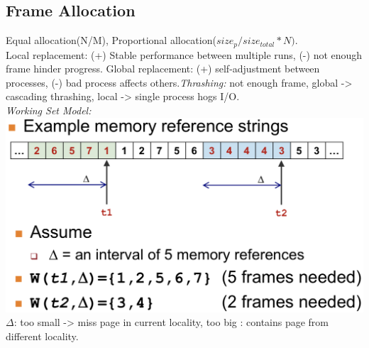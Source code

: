\subsection*{Frame Allocation}
Equal allocation(N/M), Proportional allocation($size_p/size_{total}*N)$.\\
Local replacement: (+) Stable performance between multiple runs, (-) not enough frame hinder progress. Global replacement: (+) self-adjustment between processes, (-) bad process affects others.\emph{Thrashing:} not enough frame, global -> cascading thrashing, local -> single process hogs I/O.\\
\emph{Working Set Model:}\\
\includegraphics[width=0.75\linewidth]{images/working-set-example}\\
$\Delta$: too small -> miss page in current locality, too big : contains page from different locality.